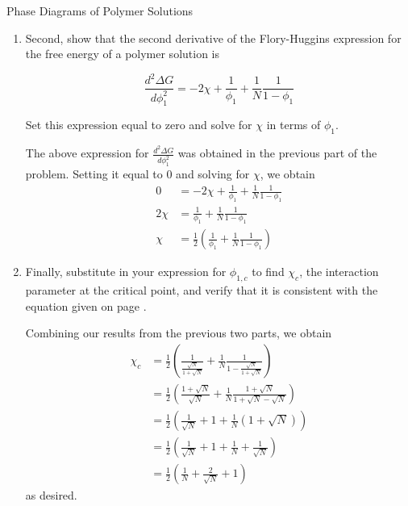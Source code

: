 \begin{activity}{Phase Diagrams of Polymer Solutions}
\begin{exercises}
\begin{enumerate}
		
			\item Second, show that the second derivative of the Flory-Huggins expression for the free energy of a polymer solution is
	
				\begin{equation*}
					\frac{d^2\Delta G}{d\phi_1^2} = -2\chi + \frac{1}{\phi_1} + \frac{1}{N}\frac{1}{1-\phi_1}
				\end{equation*}
		
				Set this expression equal to zero and solve for $\chi$ in terms of $\phi_1$.
			
				\begin{solution}{}
					The above expression for $\frac{d^2\Delta G}{d\phi_1^2}$ was obtained in the previous part of the problem.  Setting it equal to 0 and solving for $\chi$, we obtain
					\begin{align*}
						0 &= -2\chi + \frac{1}{\phi_1} + \frac{1}{N}\frac{1}{1-\phi_1}\\
						2\chi &= \frac{1}{\phi_1} + \frac{1}{N}\frac{1}{1-\phi_1}\\
						\chi &= \frac{1}{2}\left(\frac{1}{\phi_1} + \frac{1}{N}\frac{1}{1-\phi_1}\right)
					\end{align*}
				\end{solution}
				
				
			\item Finally, substitute in your expression for $\phi_{1,c}$ to find $\chi_c$, the interaction parameter at the critical point, and verify that it is consistent with the equation given on page \pageref{\labelbase:infobox:critpt}.
			
				\begin{solution}{}
					Combining our results from the previous two parts, we obtain
					\begin{align*}
						\chi_c &= \frac{1}{2}\left(\frac{1}{\frac{\sqrt{N}}{1+\sqrt{N}}} + \frac{1}{N}\frac{1}{1-\frac{\sqrt{N}}{1+\sqrt{N}}}\right)\\
							&= \frac{1}{2}\left(\frac{1+\sqrt{N}}{\sqrt{N}} + \frac{1}{N}\frac{1+\sqrt{N}}{1+\sqrt{N}-\sqrt{N}}\right)\\
							&= \frac{1}{2}\left(\frac{1}{\sqrt{N}} + 1 +\frac{1}{N}(1+\sqrt{N})\right)\\
							&= \frac{1}{2}\left(\frac{1}{\sqrt{N}} + 1 + \frac{1}{N} + \frac{1}{\sqrt{N}}\right)\\
							&= \frac{1}{2}\left(\frac{1}{N} + \frac{2}{\sqrt{N}}+1\right)
					\end{align*}
					as desired.
				\end{solution}
				

\end{enumerate}
\end{exercises}
\end{activity}
